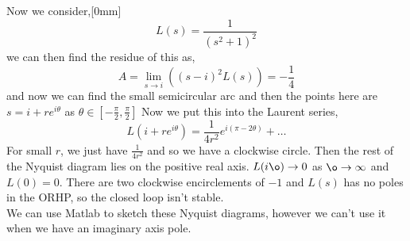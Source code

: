 
Now we consider,[0mm]
$$ L(s) = \frac{1}{(s^2 + 1)^2} $$
we can then find the residue of this as,
$$ A = \lim_{s \to i} ((s - i)^2 L(s)) = - \frac{1}{4} $$
and now we can find the small semicircular arc and then the points here are $s = i + re^{i \theta}$ as $\theta \in [-\frac{\pi }{2}, \frac{\pi }{2}]$
Now we put this into the Laurent series,
$$ L(i + re^{i \theta}) = \frac{1}{4r^2} e^{i (\pi - 2 \theta)} + \dots $$
For small $r$, we just have $\frac{1 }{4r^2}$ and so we have a clockwise circle. Then the rest of the Nyquist diagram lies on the positive real axis. $L(i \o) \to 0$ as $\o \to \infty$ and $L(0) = 0$. There are two clockwise encirclements of $-1$ and $L(s)$ has no poles in the ORHP, so the closed loop isn't stable.\\

\noindent
We can use Matlab to sketch these Nyquist diagrams, however we can't use it when we have an imaginary axis pole.


